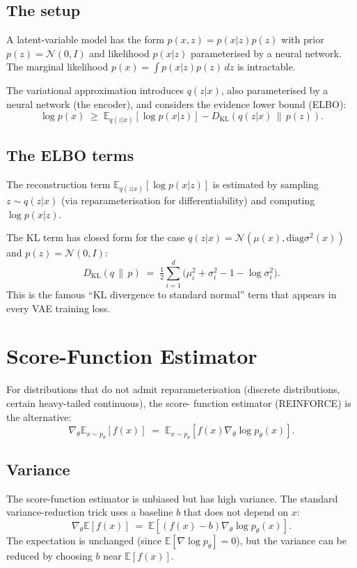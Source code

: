 \subsection{The setup}
\label{ssec:distributions:vi_setup}

A latent-variable model has the form $p(x, z) = p(x|z) p(z)$
with prior $p(z) = \mathcal{N}(0, I)$ and likelihood $p(x|z)$
parameterised by a neural network. The marginal likelihood
$p(x) = \int p(x|z) p(z)\, dz$ is intractable.

The variational approximation introduces $q(z|x)$, also
parameterised by a neural network (the encoder), and considers
the evidence lower bound (ELBO):
\[
\log p(x) \;\geq\; \mathbb{E}_{q(z|x)}[\log p(x|z)] - D_{\mathrm{KL}}(q(z|x) \,\|\, p(z)).
\]

\subsection{The ELBO terms}
\label{ssec:distributions:elbo_terms}

The reconstruction term $\mathbb{E}_{q(z|x)}[\log p(x|z)]$ is
estimated by sampling $z \sim q(z|x)$ (via reparameterisation
for differentiability) and computing $\log p(x | z)$.

The KL term has closed form for the case
$q(z|x) = \mathcal{N}(\mu(x), \mathrm{diag}\sigma^2(x))$ and
$p(z) = \mathcal{N}(0, I)$:
\[
D_{\mathrm{KL}}(q \,\|\, p) \;=\; \tfrac{1}{2} \sum_{i=1}^d
\bigl(\mu_i^2 + \sigma_i^2 - 1 - \log \sigma_i^2\bigr).
\]
This is the famous ``KL divergence to standard normal'' term that
appears in every VAE training loss.

\section{Score-Function Estimator}
\label{sec:distributions:score_estimator}

For distributions that do not admit reparameterisation (discrete
distributions, certain heavy-tailed continuous), the score-
function estimator (REINFORCE) is the alternative:
\[
\nabla_\theta \mathbb{E}_{x \sim p_\theta}[f(x)]
\;=\; \mathbb{E}_{x \sim p_\theta}[f(x) \nabla_\theta \log p_\theta(x)].
\]

\subsection{Variance}
\label{ssec:distributions:score_variance}

The score-function estimator is unbiased but has high variance.
The standard variance-reduction trick uses a baseline $b$ that
does not depend on $x$:
\[
\nabla_\theta \mathbb{E}[f(x)]
\;=\; \mathbb{E}[(f(x) - b) \nabla_\theta \log p_\theta(x)].
\]
The expectation is unchanged (since
$\mathbb{E}[\nabla \log p_\theta] = 0$), but the variance can be
reduced by choosing $b$ near $\mathbb{E}[f(x)]$.

